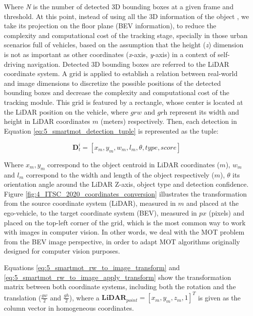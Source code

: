 Where \textit{N} is the number of detected 3D bounding boxes at a given frame and threshold. At this point, instead of using all the 3D information of the object \cite{chiu2021probabilistic, weng20203d}, we take its projection on the floor plane (\ac{BEV} information), to reduce the complexity and computational cost of the tracking stage, specially in those urban scenarios full of vehicles, based on the assumption that the height (\textit{z}) dimension is not as important as other coordinates (\textit{x}-axis, \textit{y}-axis) in a context of self-driving navigation. Detected 3D bounding boxes are referred to the LiDAR coordinate system. A grid is applied to establish a relation between real-world and image dimensions to discretize the possible positions of the detected bounding boxes and decrease the complexity and computational cost of the tracking module. This grid is featured by a rectangle, whose center is located at the LiDAR position on the vehicle, where $\textit{grw}$ and $\textit{grh}$ represent its width and height in LiDAR coordinates $\textit{m}$ (meters) respectively. Then, each detection in Equation \ref{eq:5_smartmot_detection_tuple} is represented as the tuple:

\begin{equation}
	\label{eq:5_smartmot_detection_tuple}
	\textbf{D}_{t}^{i} = [x_{m},y_{m},w_{m},l_{m},\theta,type,score]
\end{equation}

Where $\textit{$x_{m},y_{m}$}$ correspond to the object centroid in LiDAR coordinates ($\textit{m}$), $\textit{$w_{m}$}$ and $\textit{$l_{m}$}$ correspond to the width and length of the object respectively ($\textit{m}$), $\theta$ its orientation angle around the LiDAR Z-axis, object type and detection confidence. Figure \ref{fig:4_ITSC_2020_coordinates_conversion} illustrates the transformation from the source coordinate system (LiDAR), measured in $\textit{m}$ and placed at the ego-vehicle, to the target coordinate system (BEV), measured in $\textit{px}$ (pixels) and placed on the top-left corner of the grid, which is the most common way to work with images in computer vision. In other words, we deal with the \ac{MOT} problem from the \ac{BEV} image perspective, in order to adapt \ac{MOT} algorithms originally designed for computer vision purposes. 

Equations \ref{eq:5_smartmot_rw_to_image_transform} and \ref{eq:5_smartmot_rw_to_image_apply_transform} show the transformation matrix between both coordinate systems, including both the rotation and the translation (\textit{$\frac{gw}{2}$} and \textit{$\frac{gh}{2}$}), where a $\textbf{LiDAR}_{point}=[x_{m},y_{m},z_{m},1]^{T}$ is given as the column vector in homogeneous coordinates.

